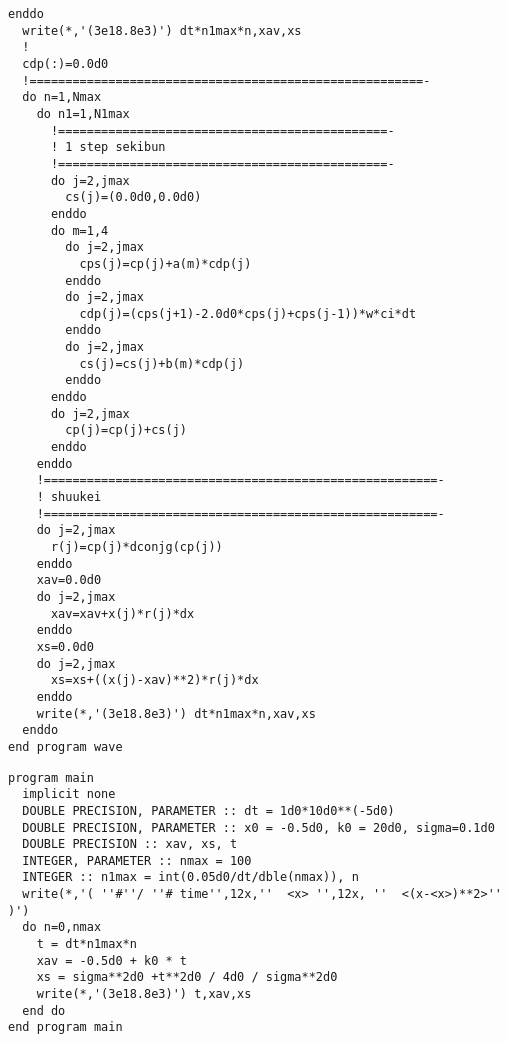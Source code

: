 \begin{lstlisting}[caption=4-Aのソースコード,label=src4a]
  enddo
  write(*,'(3e18.8e3)') dt*n1max*n,xav,xs
  !
  cdp(:)=0.0d0
  !=======================================================-
  do n=1,Nmax
    do n1=1,N1max
      !==============================================-
      ! 1 step sekibun
      !==============================================-
      do j=2,jmax
        cs(j)=(0.0d0,0.0d0)
      enddo
      do m=1,4
        do j=2,jmax
          cps(j)=cp(j)+a(m)*cdp(j)
        enddo
        do j=2,jmax
          cdp(j)=(cps(j+1)-2.0d0*cps(j)+cps(j-1))*w*ci*dt
        enddo
        do j=2,jmax
          cs(j)=cs(j)+b(m)*cdp(j)
        enddo
      enddo
      do j=2,jmax
        cp(j)=cp(j)+cs(j)
      enddo
    enddo
    !=======================================================-
    ! shuukei
    !=======================================================-
    do j=2,jmax
      r(j)=cp(j)*dconjg(cp(j))
    enddo
    xav=0.0d0
    do j=2,jmax
      xav=xav+x(j)*r(j)*dx
    enddo
    xs=0.0d0
    do j=2,jmax
      xs=xs+((x(j)-xav)**2)*r(j)*dx
    enddo
    write(*,'(3e18.8e3)') dt*n1max*n,xav,xs
  enddo
end program wave
\end{lstlisting}
\newpage
\begin{lstlisting}[caption=厳密解の計算プログラム,label=src4ad]
program main
  implicit none
  DOUBLE PRECISION, PARAMETER :: dt = 1d0*10d0**(-5d0)
  DOUBLE PRECISION, PARAMETER :: x0 = -0.5d0, k0 = 20d0, sigma=0.1d0
  DOUBLE PRECISION :: xav, xs, t
  INTEGER, PARAMETER :: nmax = 100
  INTEGER :: n1max = int(0.05d0/dt/dble(nmax)), n
  write(*,'( ''#''/ ''# time'',12x,''  <x> '',12x, ''  <(x-<x>)**2>'' )')
  do n=0,nmax
    t = dt*n1max*n
    xav = -0.5d0 + k0 * t
    xs = sigma**2d0 +t**2d0 / 4d0 / sigma**2d0
    write(*,'(3e18.8e3)') t,xav,xs
  end do
end program main
\end{lstlisting}
\newpage
